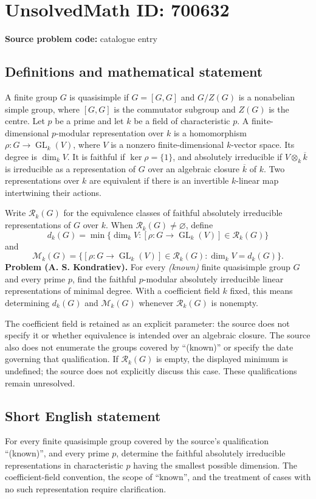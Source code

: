 \documentclass[11pt]{article}
\begin{document}
\section*{UnsolvedMath ID: 700632}
\textbf{Source problem code:} catalogue entry
\subsection{Definitions and mathematical statement}
A finite group \(G\) is quasisimple if \(G=[G,G]\) and \(G/Z(G)\) is a nonabelian simple group, where \([G,G]\) is the commutator subgroup and \(Z(G)\) is the centre. Let \(p\) be a prime and let \(k\) be a field of characteristic \(p\). A finite-dimensional \(p\)-modular representation over \(k\) is a homomorphism \(\rho\colon G\to\operatorname{GL}_k(V)\), where \(V\) is a nonzero finite-dimensional \(k\)-vector space. Its degree is \(\dim_k V\). It is faithful if \(\ker\rho=\{1\}\), and absolutely irreducible if \(V\otimes_k\overline{k}\) is irreducible as a representation of \(G\) over an algebraic closure \(\overline{k}\) of \(k\). Two representations over \(k\) are equivalent if there is an invertible \(k\)-linear map intertwining their actions.

Write \(\mathcal R_k(G)\) for the equivalence classes of faithful absolutely irreducible representations of \(G\) over \(k\). When \(\mathcal R_k(G)\ne\varnothing\), define
\[
 d_k(G)=\min\{\dim_k V:[\rho\colon G\to\operatorname{GL}_k(V)]\in\mathcal R_k(G)\}
\]
and
\[
 \mathcal M_k(G)=\{[\rho\colon G\to\operatorname{GL}_k(V)]\in\mathcal R_k(G):\dim_k V=d_k(G)\}.
\]
\textbf{Problem (A. S. Kondratiev).} For every \emph{(known)} finite quasisimple group \(G\) and every prime \(p\), find the faithful \(p\)-modular absolutely irreducible linear representations of minimal degree. With a coefficient field \(k\) fixed, this means determining \(d_k(G)\) and \(\mathcal M_k(G)\) whenever \(\mathcal R_k(G)\) is nonempty.

The coefficient field is retained as an explicit parameter: the source does not specify it or whether equivalence is intended over an algebraic closure. The source also does not enumerate the groups covered by ``(known)'' or specify the date governing that qualification. If \(\mathcal R_k(G)\) is empty, the displayed minimum is undefined; the source does not explicitly discuss this case. These qualifications remain unresolved.
\subsection{Short English statement}
For every finite quasisimple group covered by the source's qualification ``(known)'', and every prime \(p\), determine the faithful absolutely irreducible representations in characteristic \(p\) having the smallest possible dimension. The coefficient-field convention, the scope of ``known'', and the treatment of cases with no such representation require clarification.
\end{document}
